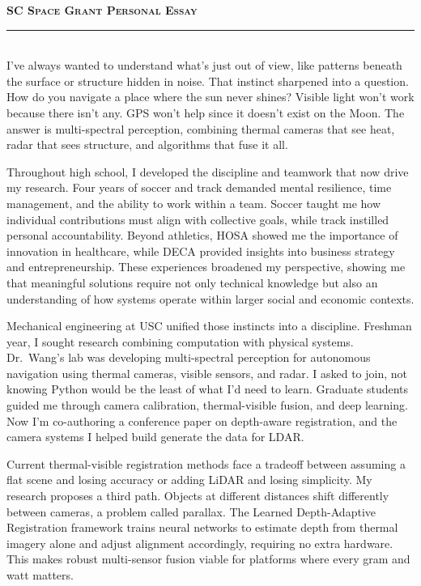 \documentclass[12pt]{article}
\begin{document}
{\color{garnet}\large\textbf{\textsc{SC Space Grant Personal Essay}}}\\[-0.8em]
{\color{garnet}\rule{\textwidth}{0.5pt}}\\[0.2em]
I've always wanted to understand what's just out of view, like patterns beneath the surface or structure hidden in noise. That instinct sharpened into a question. How do you navigate a place where the sun never shines? Visible light won't work because there isn't any. GPS won't help since it doesn't exist on the Moon. The answer is multi-spectral perception, combining thermal cameras that see heat, radar that sees structure, and algorithms that fuse it all.

Throughout high school, I developed the discipline and teamwork that now drive my research. Four years of soccer and track demanded mental resilience, time management, and the ability to work within a team. Soccer taught me how individual contributions must align with collective goals, while track instilled personal accountability. Beyond athletics, HOSA showed me the importance of innovation in healthcare, while DECA provided insights into business strategy and entrepreneurship. These experiences broadened my perspective, showing me that meaningful solutions require not only technical knowledge but also an understanding of how systems operate within larger social and economic contexts.

Mechanical engineering at USC unified those instincts into a discipline. Freshman year, I sought research combining computation with physical systems. Dr.\ Wang's lab was developing multi-spectral perception for autonomous navigation using thermal cameras, visible sensors, and radar. I asked to join, not knowing Python would be the least of what I'd need to learn. Graduate students guided me through camera calibration, thermal-visible fusion, and deep learning. Now I'm co-authoring a conference paper on depth-aware registration, and the camera systems I helped build generate the data for LDAR.

Current thermal-visible registration methods face a tradeoff between assuming a flat scene and losing accuracy or adding LiDAR and losing simplicity. My research proposes a third path. Objects at different distances shift differently between cameras, a problem called parallax. The Learned Depth-Adaptive Registration framework trains neural networks to estimate depth from thermal imagery alone and adjust alignment accordingly, requiring no extra hardware. This makes robust multi-sensor fusion viable for platforms where every gram and watt matters.
\end{document}
